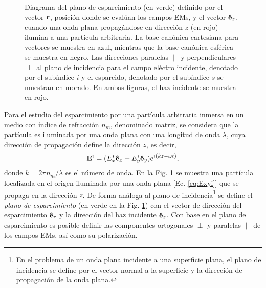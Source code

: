 \begin{figure}[b!]
%
\caption{Diagrama del plano de esparcimiento (en verde) definido por el vector $\vb{r}$, posición donde se evalúan los campos EMs, y el vector $\vu{e}_z$, cuando una onda plana propagándose en dirección $z$ (en rojo) ilumina a una partícula arbitraria.  La base canónica cartesiana para vectores se muestra en azul, mientras que la base canónica esférica se muestra en negro.  Las direcciones paralelas $\parallel$ y perpendiculares $\perp$ al plano de incidencia  para el campo eléctro incidente, denotado por el subíndice $i$ y el esparcido, denotado por el subíndice $s$ se muestran en morado.  En ambas figuras, el haz incidente se muestra en rojo.}\label{fig:PlanoEsparcimiento}
	\end{figure}	

Para el estudio del esparcimiento por una partícula arbitraria inmersa en un medio con índice de refracción $n_m$, denominado  matriz, se considera que la partícula es iluminada por una onda plana con una longitud de onda $\lambda$, cuya dirección de propagación define la dirección $z$, es decir,
	\begin{align}
	\vb{E}^i = (E_x^i \vu{e}_x + E_y^i \vu{e}_y)e^{i(k z - \omega t)},
	\label{eq:Exyi}
	\end{align}
donde $k = 2\pi n_m /\lambda$ es el número de onda. En la Fig.  \ref{fig:PlanoEsparcimiento} se muestra  una partícula localizada en el origen iluminada por una onda plana [Ec. \eqref{eq:Exyi}] que se propaga en la dirección $z$.  De forma análoga al plano de incidencia\footnote{En el problema de un onda plana incidente a una superficie plana, el plano de incidencia se define por el vector normal a la superficie y la dirección de propagación de la onda plana.} se define el \emph{plano de esparcimiento} (en verde en la Fig. \ref{fig:PlanoEsparcimiento}) con el vector de dirección del esparcimiento $\vu{e}_r$ y la dirección del haz incidente $\vu{e}_z$. Con base en el plano de esparcimiento es posible definir las componentes ortogonales $\perp$ y paralelas $\parallel$ de los campos EMs, así como su polarización. 

